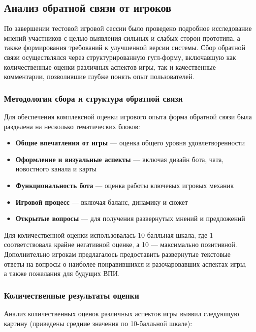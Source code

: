 \subsection{Анализ обратной связи от игроков}

По завершении тестовой игровой сессии было проведено подробное исследование мнений участников с целью выявления сильных и слабых сторон прототипа, а также формирования требований к улучшенной версии системы. Сбор обратной связи осуществлялся через структурированную гугл-форму, включавшую как количественные оценки различных аспектов игры, так и качественные комментарии, позволившие глубже понять опыт пользователей.

\subsubsection{Методология сбора и структура обратной связи}

Для обеспечения комплексной оценки игрового опыта форма обратной связи была разделена на несколько тематических блоков:

\begin{itemize}
    \item \textbf{Общие впечатления от игры} — оценка общего уровня удовлетворенности
    \item \textbf{Оформление и визуальные аспекты} — включая дизайн бота, чата, новостного канала и карты
    \item \textbf{Функциональность бота} — оценка работы ключевых игровых механик
    \item \textbf{Игровой процесс} — включая баланс, динамику и сюжет
    \item \textbf{Открытые вопросы} — для получения развернутых мнений и предложений
\end{itemize}

Для количественной оценки использовалась 10-балльная шкала, где 1 соответствовала крайне негативной оценке, а 10 — максимально позитивной. Дополнительно игрокам предлагалось предоставить развернутые текстовые ответы на вопросы о наиболее понравившихся и разочаровавших аспектах игры, а также пожелания для будущих ВПИ.

\subsubsection{Количественные результаты оценки}

Анализ количественных оценок различных аспектов игры выявил следующую картину (приведены средние значения по 10-балльной шкале):

